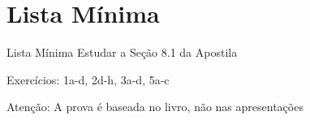 \documentclass[fleqn,utf8,aspectratio=169,12pt]{beamer}
\begin{document}
\section{Lista Mínima}

\begin{frame}{Lista Mínima}
  Estudar a Seção 8.1 da Apostila

  \vfill
  Exercícios: 1a-d, 2d-h, 3a-d, 5a-c

  \vfill
  Atenção: A prova é baseada no livro, não nas apresentações
\end{frame}

\end{document}
